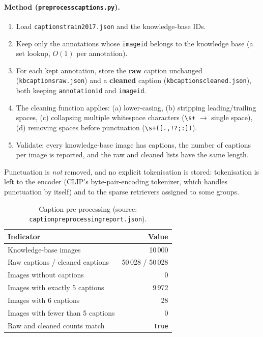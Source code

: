 \documentclass[11pt,a4paper]{article}
\renewcommand{\_}{\textunderscore\allowbreak{}}
\newcommand{\code}[1]{\texttt{#1}}
\begin{document}
\paragraph{Method (\code{preprocess\_captions.py}).}
\begin{enumerate}[nosep]
  \item Load \code{captions\_train2017.json} and the knowledge-base IDs.
  \item Keep only the annotations whose \code{image\_id} belongs to the knowledge base (a set lookup, $O(1)$ per annotation).
  \item For each kept annotation, store the \textbf{raw} caption unchanged (\code{kb\_captions\_raw.json}) and a \textbf{cleaned} caption (\code{kb\_captions\_cleaned.json}), both keeping \code{annotation\_id} and \code{image\_id}.
  \item The cleaning function applies: (a) lower-casing, (b) stripping leading/trailing spaces, (c) collapsing multiple whitespace characters (\verb|\s+| $\to$ single space), (d) removing spaces before punctuation (\verb|\s+([.,!?;:])|).
  \item Validate: every knowledge-base image has captions, the number of captions per image is reported, and the raw and cleaned lists have the same length.
\end{enumerate}
Punctuation is \emph{not} removed, and no explicit tokenisation is stored: tokenisation is left to the encoder (CLIP's byte-pair-encoding tokenizer, which handles punctuation by itself) and to the sparse retrievers assigned to some groups.

\begin{table}[H]
\centering
\begin{tabular}{@{}lr@{}}
\toprule
\textbf{Indicator} & \textbf{Value}\\
\midrule
Knowledge-base images & 10\,000\\
Raw captions / cleaned captions & 50\,028 / 50\,028\\
Images without captions & 0\\
Images with exactly 5 captions & 9\,972\\
Images with 6 captions & 28\\
Images with fewer than 5 captions & 0\\
Raw and cleaned counts match & \texttt{True}\\
\bottomrule
\end{tabular}
\caption{Caption pre-processing (source: \code{caption\_preprocessing\_report.json}).}
\end{table}
\end{document}
